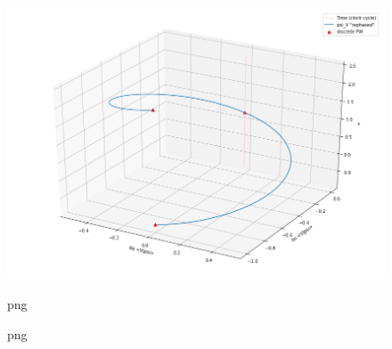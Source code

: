 \begin{figure}
\centering
\includegraphics[width=\textwidth/2]{img/psi_V.png}
\caption[]{png}{png}
\end{figure}
